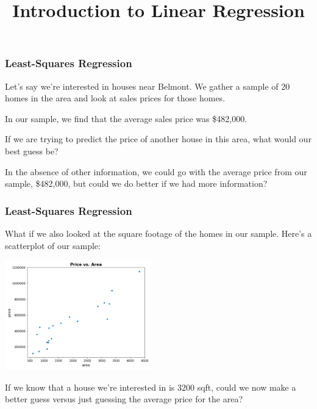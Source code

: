 \documentclass[11pt, table]{beamer}
\newcommand{\p}{\pause}
\begin{document}
	\title{Introduction to Linear Regression}
	\begin{frame}[plain]
	\maketitle
\end{frame}

\begin{frame}
\frametitle{Least-Squares Regression}
Let's say we're interested in houses near Belmont. We gather a sample of 20 homes in the area and look at sales prices for those homes.
\vspace{0.1in}

In our sample, we find that the average sales price was \$482,000.
\vspace{0.1in}

If we are trying to predict the price of another house in this area, what would our best guess be?\vspace{0.1in}\p

In the absence of other information, we could go with the average price from our sample, \$482,000, but could we do better if we had more information?
\end{frame}

\begin{frame}
\frametitle{Least-Squares Regression}
What if we also looked at the square footage of the homes in our sample. Here's a scatterplot of our sample:

\begin{center}
	\includegraphics[width=2.5in]{images/Appraisal_Values/scatter.png}
\end{center}

If we know that a house we're interested in is 3200 sqft, could we now make a better guess versus just guessing the average price for the area?

\end{frame}
\end{document}
